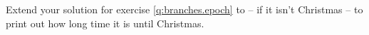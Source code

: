 Extend your solution for exercise \ref{q:branches.epoch} to -- if it isn't Christmas -- to print out how long time it is until Christmas.
